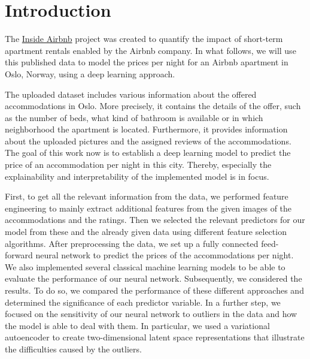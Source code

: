 \section{Introduction}


The \href{http://insideairbnb.com/get-the-data.html}{Inside Airbnb} project \citep{cox2022} was created to quantify the impact of short-term apartment rentals enabled by the Airbnb company.
In what follows, we will use this published data to model the prices per night for an Airbnb apartment in Oslo, Norway, using a deep learning approach.

The uploaded dataset includes various information about the offered accommodations in Oslo. More precisely, it contains the details of the offer, such as the number of beds, what kind of bathroom is available or in which neighborhood the apartment is located. Furthermore, it provides information about the uploaded pictures and the assigned reviews of the accommodations.
The goal of this work now is to establish a deep learning model to predict the price of an accommodation per night in this city. Thereby, especially the explainability and interpretability of the implemented model is in focus.

First, to get all the relevant information from the data, we performed feature engineering to mainly extract additional features from the given images of the accommodations and the ratings. Then we selected the relevant predictors for our model from these and the already given data using different feature selection algorithms. After preprocessing the data, we set up a fully connected feed-forward neural network to predict the prices of the accommodations per night. We also implemented several classical machine learning models to be able to evaluate the performance of our neural network.
Subsequently, we considered the results. To do so, we compared the performance of these different approaches and determined the significance of each predictor variable. In a further step, we focused on the sensitivity of our neural network to outliers in the data and how the model is able to deal with them. In particular, we used a variational autoencoder to create two-dimensional latent space representations that illustrate the difficulties caused by the outliers.

